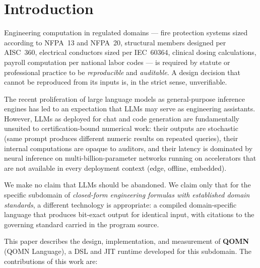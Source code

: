 \documentclass[11pt,a4paper]{article}
\begin{document}
\section{Introduction}
\label{sec:intro}

Engineering computation in regulated domains --- fire protection systems sized according to NFPA~13 and NFPA~20, structural members designed per AISC~360, electrical conductors sized per IEC~60364, clinical dosing calculations, payroll computation per national labor codes --- is required by statute or professional practice to be \emph{reproducible} and \emph{auditable}. A design decision that cannot be reproduced from its inputs is, in the strict sense, unverifiable.

The recent proliferation of large language models as general-purpose inference engines has led to an expectation that LLMs may serve as engineering assistants. However, LLMs as deployed for chat and code generation are fundamentally unsuited to certification-bound numerical work: their outputs are stochastic (same prompt produces different numeric results on repeated queries), their internal computations are opaque to auditors, and their latency is dominated by neural inference on multi-billion-parameter networks running on accelerators that are not available in every deployment context (edge, offline, embedded).

We make no claim that LLMs should be abandoned. We claim only that for the specific subdomain of \emph{closed-form engineering formulas with established domain standards}, a different technology is appropriate: a compiled domain-specific language that produces bit-exact output for identical input, with citations to the governing standard carried in the program source.

This paper describes the design, implementation, and measurement of \textbf{QOMN} (QOMN Language), a DSL and JIT runtime developed for this subdomain. The contributions of this work are:
\end{document}
